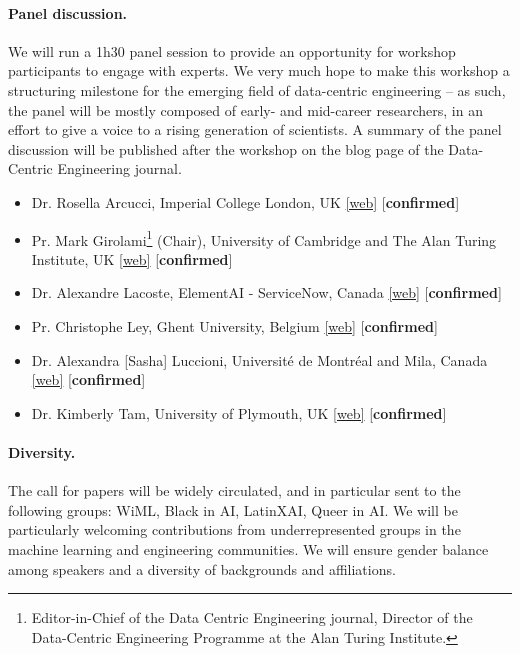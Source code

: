 \documentclass[11pt,a4paper]{scrartcl}
\theoremstyle{plain}  %
\begin{document}
\paragraph{Panel discussion.} We will run a 1h30 panel session to provide an opportunity for workshop participants to engage with experts. We very much hope to make this workshop a structuring milestone for the emerging field of data-centric engineering -- as such, the panel will be mostly composed of early- and mid-career researchers, in an effort to give a voice to a rising generation of scientists. A summary of the panel discussion will be published after the workshop on the blog page of the Data-Centric Engineering journal.
\begin{itemize}
 \item Dr. Rosella Arcucci, Imperial College London, UK \href{https://www.imperial.ac.uk/people/r.arcucci}{[web]} [\textbf{confirmed}]
 \item Pr. Mark Girolami\footnote{Editor-in-Chief of the Data Centric Engineering journal, Director of the Data-Centric Engineering Programme at the Alan Turing Institute.} (Chair), University of Cambridge and The Alan Turing Institute, UK \href{https://prof-girolami.uk}{[web]} [\textbf{confirmed}]
 \item Dr. Alexandre Lacoste, ElementAI - ServiceNow, Canada \href{https://scholar.google.co.uk/citations?user=71a2-WMAAAAJ&hl=en}{[web]} [\textbf{confirmed}]
 \item Pr. Christophe Ley, Ghent University, Belgium \href{https://users.ugent.be/~chley/#/home}{[web]} [\textbf{confirmed}]
 \item Dr. Alexandra [Sasha] Luccioni, Université de Montréal and Mila, Canada \href{https://www.sashaluccioni.com}{[web]} [\textbf{confirmed}]
 \item Dr. Kimberly Tam, University of Plymouth, UK \href{https://www.plymouth.ac.uk/staff/kimberly-tam}{[web]} [\textbf{confirmed}]
\end{itemize}

\paragraph{Diversity.} The call for papers will be widely circulated, and in particular sent to the following groups: WiML, Black in AI, LatinXAI, Queer in AI. We will be particularly welcoming contributions from underrepresented groups in the machine learning and engineering communities. We will ensure gender balance among speakers and a diversity of backgrounds and affiliations.
\end{document}
